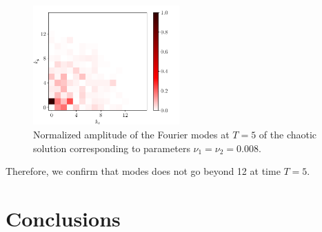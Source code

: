 \documentclass[twoside]{article}
\begin{document}
\begin{figure}[ht]
  \centering
  \includegraphics[width=0.5\textwidth]{images/slice_freq_nu1_0.008_nu2_0.008_time_5.0.pdf}
  \caption{Normalized amplitude of the Fourier modes at $T=5$ of the chaotic solution corresponding to parameters $\nu_1=\nu_2=0.008$.}
  \label{fig:chaotic_modes}
\end{figure}
Therefore, we confirm that modes does not go beyond 12 at time $T=5$.
\section{Conclusions}

{}
\printbibliography
\end{document}
